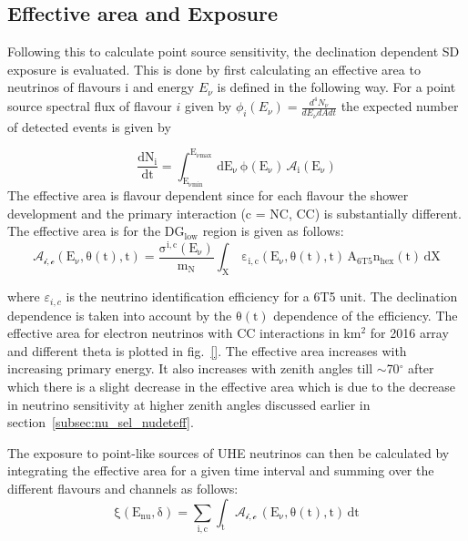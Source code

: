 \subsection{Effective area and Exposure}
\label{subsec:psource_area}
Following this to calculate point source sensitivity, the declination dependent SD exposure is evaluated. This is done by first calculating an effective area to neutrinos of flavours i and energy $E_{\nu}$ is defined in the following way. For a point source spectral flux of flavour $i$ given by $\phi_i(E_{\nu}) = \frac{d^4 N_{\nu}}{dE_{\nu} dA dt}$ the expected number of detected events is given by 

\begin{equation}
  \label{eq:expected_events_point}
  \mathrm{\frac{dN_{i}}{dt} = \int_{E_{\nu min}}^{E_{\nu max}} \, dE_{\nu} \, \phi(E_{\nu}) \, \mathcal{A}_i(E_{\nu})}
\end{equation}
The effective area is flavour dependent since for each flavour the shower development and the primary interaction (c = NC, CC) is substantially different. The effective area is for the DG$\mathrm{_{low}}$ region is given as follows:
\begin{equation}
  \label{eq:effective_area}
  \mathrm{\mathcal{A_{i,c}}(E_{\nu},\theta(t),t) = \frac{\sigma^{i,c}(E_{\nu})}{m_N} \int_{X} \, \varepsilon_{i,c}(E_{\nu},\theta(t),t) \, A_{6T5} n_{hex}(t) \, dX}
\end{equation}

where $\varepsilon_{i,c}$ is the neutrino identification efficiency for a 6T5 unit. The declination dependence is taken into account by the $\mathrm{\theta(t)}$ dependence of the efficiency. The effective area for electron neutrinos with CC interactions in km$^2$ for 2016 array and different theta is plotted in fig.~\ref{}. The effective area increases with increasing primary energy. It also increases with zenith angles till $\sim$70$^\circ$ after which there is a slight decrease in the effective area which is due to the decrease in neutrino sensitivity at higher zenith angles discussed earlier in section~\ref{subsec:nu_sel_nudeteff}. 

The exposure to point-like sources of UHE neutrinos can then be calculated by integrating the effective area for a given time interval and summing over the different flavours and channels as follows:
\begin{equation}
  \label{eq:exposure_point}
  \mathrm{\xi(E_{nu}, \delta) = \sum_{i,c} \int_{t} \mathcal{A_{i,c}} \, (E_{\nu},\theta(t),t) \, dt}
\end{equation}

